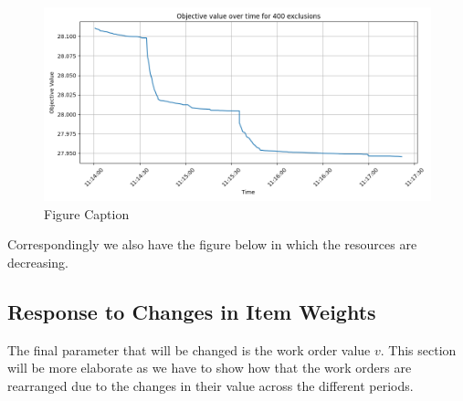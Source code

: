 \documentclass[preprint,12pt,authoryear]{elsarticle}
\begin{document}
\begin{figure}[H]%
\centering%
\includegraphics[width=1.0\textwidth]{figures/objective-resource-increases.png}
\caption{Figure Caption}\label{fig:objective-resource-increases}
\end{figure}

Correspondingly we also have the figure below in which the resources are decreasing.

\subsection{Response to Changes in Item Weights}
The final parameter that will be changed is the work order value $v$. This section will be more elaborate as we have to show how that the work orders are rearranged due to the changes in their value across the different periods.
\end{document}
